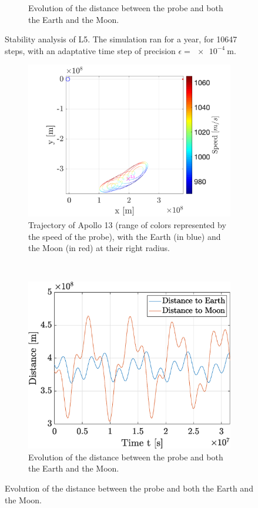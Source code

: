 \documentclass[a4paper,12pt,twoside]{article}
\begin{document}
\begin{figure}[h]
\begin{subfigure}[t]{0.4\textwidth}
    \caption{Evolution of the distance between the probe and both the Earth and the Moon.}
    \label{fig:7b_L5_dist}
  \end{subfigure}

  \caption{Stability analysis of L5. The simulation ran for a year, for \num{10647} steps, with an adaptative time step of precision $\epsilon = \SI{e-4}{\m}$.}
  \label{fig:7b_L5}
\end{figure}

\begin{figure}[h]
  \centering
  \begin{subfigure}[t]{0.55\textwidth}
    \includegraphics[width=\textwidth]{graphs/ex7b_L5_gap_traj.png}
    \caption{Trajectory of Apollo 13 (range of colors represented by the speed of the probe), with the Earth (in blue) and the Moon (in red) at their right radius.}
    \label{fig:7b_L5_gap_traj}
  \end{subfigure}
  ~
  \begin{subfigure}[t]{0.4\textwidth}
    \includegraphics[width=\textwidth]{graphs/ex7b_L5_gap_dist.eps}
    \caption{Evolution of the distance between the probe and both the Earth and the Moon.}
    \label{fig:7b_L5_gap_dist}
  \end{subfigure}


\end{figure}
\end{document}
